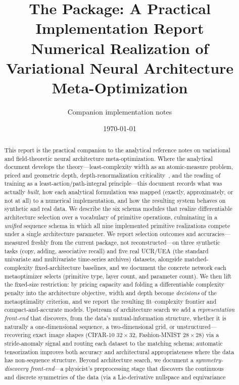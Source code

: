 \documentclass[11pt]{article}
\title{\bf The \code{ilmarinen} Package: A Practical Implementation Report\\[4pt]
\large Numerical Realization of Variational Neural Architecture Meta-Optimization}
\author{Companion implementation notes}
\date{\today}
\begin{document}
\maketitle

\begin{abstract}
This report is the practical companion to the analytical reference notes on variational and
field-theoretic neural architecture meta-optimization. Where the analytical document develops
the theory---least-complexity width as an atomic-measure problem, priced and geometric depth,
depth-renormalization criticality~\cite{mehta2014rg,poole2016chaos}, and the reading of training as a least-action/path-integral
principle---this document records what was actually \emph{built}, how each analytical
formulation was mapped (exactly, approximately, or not at all) to a numerical implementation,
and how the resulting system behaves on synthetic and real data. We describe the six
schema modules that realize differentiable architecture selection over a vocabulary of
primitive operations, culminating in a \emph{unified} sequence schema in which all nine
implemented primitive realizations compete under a single architecture parameter. We report
selection outcomes and accuracies---measured freshly from the current package, not
reconstructed---on three synthetic tasks (copy, adding, associative recall) and five real
UCR/UEA (the standard univariate and multivariate time-series archives) datasets, alongside matched-complexity fixed-architecture baselines, and
we document the concrete network each metaoptimizer selects (primitive type, layer count, and
parameter count). We then lift the fixed-size restriction: by pricing capacity and folding a
differentiable complexity penalty into the architecture objective, width and depth become
\emph{decisions} of the metaoptimality criterion, and we report the resulting fit--complexity
frontier and compact-and-accurate models. Upstream of architecture search we add a
\emph{representation front-end} that discovers, from the data's mutual-information structure, whether
it is naturally a one-dimensional sequence, a two-dimensional grid, or unstructured---recovering
exact image shapes (CIFAR-10 $32\times32$, Fashion-MNIST $28\times28$) via a stride-anomaly signal and
routing each dataset to the matching schema; automatic tensorization improves both accuracy and
architectural appropriateness where the data has non-sequence structure. Beyond architecture search,
we document a
\emph{symmetry-discovery front-end}---a physicist's preprocessing stage that discovers the
continuous and discrete symmetries of the data (via a Lie-derivative nullspace and equivariance

\end{abstract}
\end{document}
